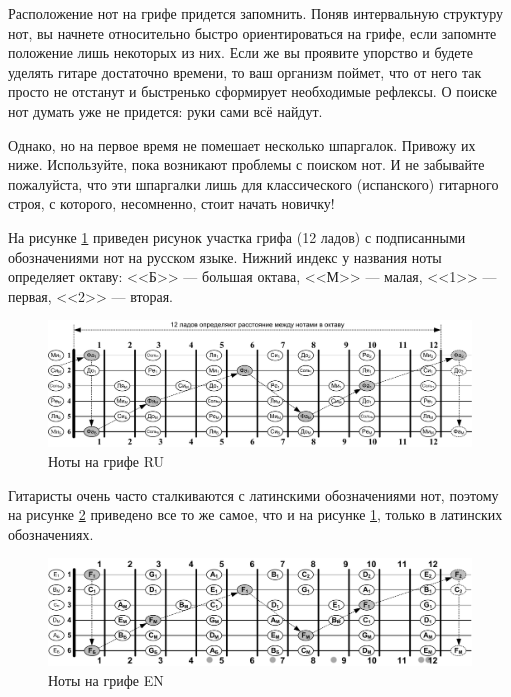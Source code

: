 Расположение нот на грифе придется запомнить. Поняв интервальную структуру нот, вы начнете относительно быстро ориентироваться на грифе, если запомнте положение лишь некоторых из них. Если же вы проявите упорство и будете уделять гитаре достаточно времени, то ваш организм поймет, что от него так просто не отстанут и быстренько сформирует необходимые рефлексы. О поиске нот думать уже не придется: руки сами всё найдут. 

Однако, но на первое время не помешает несколько шпаргалок. Привожу их ниже. Используйте, пока возникают проблемы с поиском нот. И не забывайте пожалуйста, что эти шпаргалки лишь для классического (испанского) гитарного строя, с которого, несомненно, стоит начать новичку!

На рисунке \ref{fig:guitar:notes-on-griph-ru} приведен рисунок участка грифа (12 ладов) с подписанными обозначениями нот на русском языке. Нижний индекс у названия ноты определяет октаву: <<Б>> --- большая октава, <<М>> --- малая, <<1>> --- первая, <<2>> --- вторая.

\begin{figure}[!ht]
    \centering
    \includegraphics[width=\textwidth]{fig/notes-on-griph-ru} 
    \caption{Ноты на грифе RU}\label{fig:guitar:notes-on-griph-ru}
\end{figure} 

Гитаристы очень часто сталкиваются с латинскими обозначениями нот, поэтому на рисунке \ref{fig:guitar:notes-on-griph-lat} приведено все то же самое, что и на рисунке \ref{fig:guitar:notes-on-griph-ru}, только в латинских обозначениях.

\begin{figure}[!ht]
    \centering
    \includegraphics[width=\textwidth]{fig/notes-on-griph-lat} 
    \caption{Ноты на грифе EN}\label{fig:guitar:notes-on-griph-lat}
\end{figure} 


